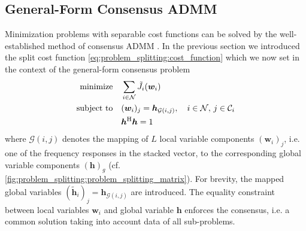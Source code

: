 \documentclass{article}
\newcommand{\hf}{{\bm{h}}}
\newcommand{\wf}{{\bm{w}}}
\newcommand{\Cset}{\mathcal{C}}
\newcommand{\Nset}{\mathcal{N}}
\begin{document}
\subsection{General-Form Consensus ADMM}
\label{ssec:general_consensus_admm}
Minimization problems with separable cost functions can be solved by the well-established method of consensus ADMM \cite{boydDistributedOptimizationStatistical2011}.
In the previous section we introduced the split cost function \eqref{eq:problem_splitting:cost_function} which we now set in the context of the general-form consensus problem
\begin{align}
    \operatorname{minimize} \quad &\sum_{i \in \Nset} \tilde{J}_i(\wf_i)\\
    \text{subject to} \quad &(\wf_i)_j = \hf_{\mathcal{G}(i,j)},\quad i \in \Nset,\,j \in \Cset_i\\
    &\hf^\herm \hf = 1
\end{align}
where \(\mathcal{G}(i,j)\) denotes the mapping of \(L\) local variable components \((\wf_i)_j\), i.e. one of the frequency responses in the stacked vector, to the corresponding global variable components \((\hf)_g\) (cf. \autoref{fig:problem_splitting:problem_splitting_matrix}).
For brevity, the mapped global variables \((\tilde{\hf}_i)_j = \hf_{\mathcal{G}(i,j)}\) are introduced.
The equality constraint between local variables \(\wf_i\) and global variable \(\hf\) enforces the consensus, i.e. a common solution taking into account data of all sub-problems.
\end{document}
